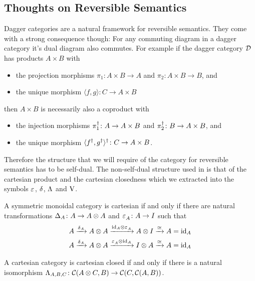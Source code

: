 \documentclass[runningheads,envcountsame]{llncs}
\begin{document}
\subsection{Thoughts on Reversible Semantics}
    
    Dagger categories are a natural framework for reversible semantics. They come with a strong consequence though: For any commuting diagram in a dagger category it's dual diagram also commutes. For example if the dagger category $\mathcal{D}$ has products $A \times B$ with 
    \begin{itemize}
        \item the projection morphisms $\pi_1\colon A \times B \to A$ and $\pi_2\colon A \times B \to B$, and
        \item the unique morphism $\langle f, g \rangle\colon C \to A \times B$
    \end{itemize}
    then $A \times B$ is necessarily also a coproduct with
    \begin{itemize}
        \item the injection morphisms $\rev{\pi_1}\colon A \to A \times B$ and $\rev{\pi_2}\colon B \to A \times B$, and
        \item the unique morphism $\rev{\langle \rev{f}, \rev{g} \rangle}\colon C \to A \times B$.
    \end{itemize}
    
    Therefore the structure that we will require of the category for reversible semantics has to be self-dual. The non-self-dual structure used in  is that of the cartesian product and the cartesian closedness which we extracted into the symbols ${\varepsilon}^{}$, $\dup$, $\curry$ and $\uncurry$. 
    
    \begin{proposition}
        A symmetric monoidal category is cartesian if and only if there are natural transformations $\Delta_A\colon A \to \tensor{A}{A}$ and ${\varepsilon}^{}_{A}\colon A \to I$ such that
        \begin{gather*}
            A \xrightarrow{\dup_A} \tensor{A}{A} \xrightarrow{\tensor{\id_A}{\terminal_A}} \tensor{A}{I} \xrightarrow{\cong} A = \id_A \\
            A \xrightarrow{\dup_A} \tensor{A}{A} \xrightarrow{\tensor{\terminal_A}{\id_A}} \tensor{I}{A} \xrightarrow{\cong} A = \id_A
        \end{gather*}
    \end{proposition}
    
    \begin{proposition}
        A cartesian category is cartesian closed if and only if there is a natural isomorphism $\curry_{A, B, C}\colon \homC{\tensor{A}{C}}{B} \to \homC{C}{\homC{A}{B}}$.
    \end{proposition}
    
\end{document}
